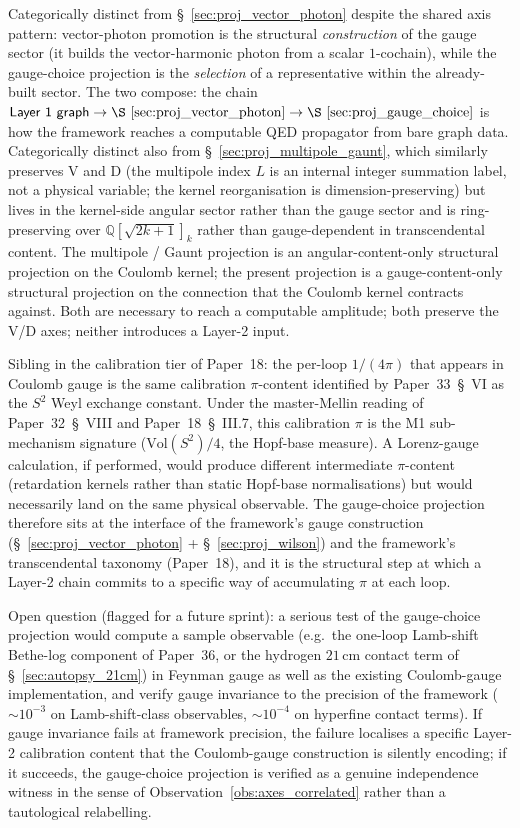 Categorically distinct from \S~\ref{sec:proj_vector_photon} despite
the shared axis pattern: vector-photon promotion is the structural
\emph{construction} of the gauge sector (it builds the vector-harmonic
photon from a scalar $1$-cochain), while the gauge-choice projection
is the \emph{selection} of a representative within the already-built
sector.  The two compose: the chain $\textsf{Layer~1 graph} \to
\S~\ref{sec:proj_vector_photon} \to \S~\ref{sec:proj_gauge_choice}$ is
how the framework reaches a computable QED propagator from bare graph
data.  Categorically distinct also from
\S~\ref{sec:proj_multipole_gaunt}, which similarly preserves V and D
(the multipole index $L$ is an internal integer summation label, not
a physical variable; the kernel reorganisation is dimension-preserving)
but lives in the kernel-side angular sector rather than the gauge
sector and is ring-preserving over $\mathbb{Q}[\sqrt{2k{+}1}]_k$ rather
than gauge-dependent in transcendental content.  The multipole / Gaunt
projection is an angular-content-only structural projection on the
Coulomb kernel; the present projection is a gauge-content-only
structural projection on the connection that the Coulomb kernel
contracts against.  Both are necessary to reach a computable
amplitude; both preserve the V/D axes; neither introduces a Layer-2
input.

Sibling in the calibration tier of Paper~18: the per-loop $1/(4\pi)$
that appears in Coulomb gauge is the same calibration $\pi$-content
identified by Paper~33~\S~VI as the $S^2$ Weyl exchange constant.
Under the master-Mellin reading of Paper~32~\S~VIII and
Paper~18~\S~III.7, this calibration $\pi$ is the M1 sub-mechanism
signature ($\mathrm{Vol}(S^2)/4$, the Hopf-base measure).  A
Lorenz-gauge calculation, if performed, would produce different
intermediate $\pi$-content (retardation kernels rather than static
Hopf-base normalisations) but would necessarily land on the same
physical observable.  The gauge-choice projection therefore sits at
the interface of the framework's gauge construction
(\S~\ref{sec:proj_vector_photon} +
\S~\ref{sec:proj_wilson}) and the framework's transcendental taxonomy
(Paper~18), and it is the structural step at which a Layer-2 chain
commits to a specific way of accumulating $\pi$ at each loop.

Open question (flagged for a future sprint): a serious test of the
gauge-choice projection would compute a sample observable (e.g.\ the
one-loop Lamb-shift Bethe-log component of Paper~36, or the
hydrogen $21$\,cm contact term of \S~\ref{sec:autopsy_21cm}) in
Feynman gauge as well as the existing Coulomb-gauge implementation,
and verify gauge invariance to the precision of the framework
($\sim10^{-3}$ on Lamb-shift-class observables, $\sim10^{-4}$ on
hyperfine contact terms).  If gauge invariance fails at framework
precision, the failure localises a specific Layer-2 calibration
content that the Coulomb-gauge construction is silently encoding;
if it succeeds, the gauge-choice projection is verified as a
genuine independence witness in the sense of
Observation~\ref{obs:axes_correlated} rather than a tautological
relabelling.
